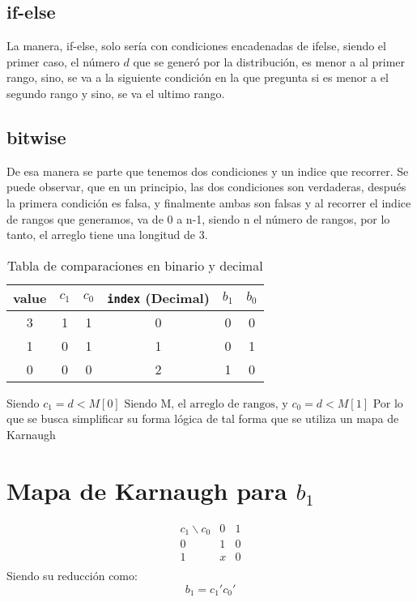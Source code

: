 \documentclass{article}
\begin{document}
\subsection*{if-else}
La manera, if-else, solo sería con condiciones encadenadas de ifelse, siendo el primer caso, el número $d$ que se generó por la distribución, es menor a al primer rango, sino, se va a la siguiente condición en la que pregunta si es menor a el segundo rango y sino, se va el ultimo rango.
\subsection*{bitwise}
De esa manera se parte que tenemos dos condiciones y un indice que recorrer.
Se puede observar, que en un principio, las dos condiciones son verdaderas, después la primera condición es falsa, y finalmente ambas son falsas y al recorrer el indice de rangos que generamos, va de 0 a n-1, siendo n el número de rangos, por lo tanto, el arreglo tiene una longitud de 3.
\begin{table}[h]
    \centering
    \caption{Tabla de comparaciones en binario y decimal}
    \begin{tabular}{cccccc}
        \toprule
       value & \(c_1\) & \(c_0\) & \texttt{index} (Decimal) & \(b_1\) & \(b_0\) \\
        \midrule
    3 &   1       & 1       & 0                      & 0      & 0      \\
    1 &   0       & 1       & 1                      & 0      & 1      \\
    0 &   0       & 0       & 2                      & 1      & 0      \\
        \bottomrule
    \end{tabular}
\end{table}
Siendo $c_1=d<M[0] \text{  Siendo M, el arreglo de rangos}$, y $c_0=d<M[1]$ 
Por lo que se busca simplificar su forma lógica de tal forma que se utiliza un mapa de Karnaugh

\section*{Mapa de Karnaugh para \(b_1\)}
\[
\begin{array}{c|c|c}
c_1 \backslash c_0 & 0 & 1 \\
\hline
0 & 1 & 0 \\
1 & x & 0 \\
\end{array}
\]
Siendo su reducción como:
\begin{equation}
    b_1=c_1'c_0'
\end{equation}
\end{document}
